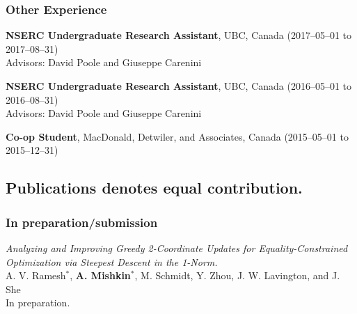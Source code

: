 \subsubsection{Other Experience}
\begin{description}[leftmargin=\mleftsize,style=nextline,font=\normalfont\space]
    \item[2017]
          \textbf{NSERC Undergraduate Research Assistant}, UBC, Canada  \hfill (2017--05--01 to 2017--08--31)
          \\
          Advisors: David Poole and Giuseppe Carenini
    \item[2016]
          \textbf{NSERC Undergraduate Research Assistant}, UBC, Canada  \hfill (2016--05--01 to 2016--08--31)
          \\
          Advisors: David Poole and Giuseppe Carenini
    \item[2015]
          \textbf{Co-op Student}, MacDonald, Detwiler, and Associates, Canada \hfill (2015--05--01 to 2015--12--31) 
\end{description}

\vspace{2ex}

\subsection{Publications
    \texorpdfstring{\hfill {\normalfont\small * denotes equal contribution.}}{}
}

\subsubsection{In preparation/submission}
\begin{description}[leftmargin=\mleftsize,style=nextline,font=\normalfont\space]
    \textit{Analyzing and Improving Greedy 2-Coordinate Updates for
        Equality-Constrained Optimization via Steepest Descent in the 1-Norm.}\\
    A. V. Ramesh$^{*}$, \textbf{A. Mishkin}$^{*}$, M. Schmidt, Y. Zhou, J. W.
    Lavington, and J. She\\
    In preparation.
\end{description}

